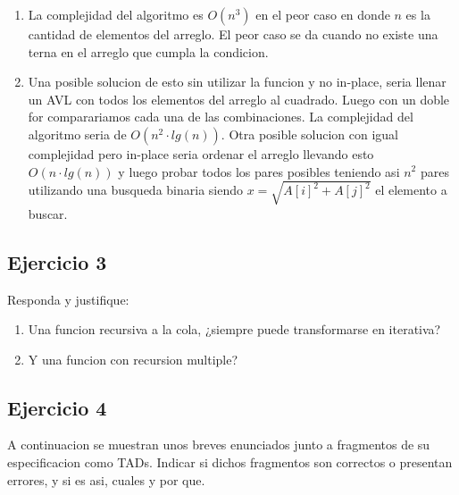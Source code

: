 \documentclass[10pt, a4paper]{article}
\begin{document}
\begin{enumerate}
 \item La complejidad del algoritmo es $O(n^3)$ en el peor caso en donde $n$ es la cantidad de elementos del arreglo. El peor caso se da cuando no existe una terna en el arreglo que cumpla la condicion.
 \item Una posible solucion de esto sin utilizar la funcion y no in-place, seria llenar un AVL con todos los elementos del arreglo al cuadrado. Luego con un doble for comparariamos cada una de las combinaciones. La complejidad del algoritmo seria de $O(n^2 \cdot lg(n))$. Otra posible solucion con igual complejidad pero in-place seria ordenar el arreglo llevando esto $O(n \cdot lg(n))$ y luego probar todos los pares posibles teniendo asi $n^2$ pares utilizando una busqueda binaria siendo $x = \sqrt{A[i]^2+A[j]^2}$ el elemento a buscar.
\end{enumerate}



\subsection*{Ejercicio 3}
Responda y justifique:
\begin{enumerate}
 \item Una funcion recursiva a la cola, ¿siempre puede transformarse en iterativa?
 \item Y una funcion con recursion multiple?
\end{enumerate}


\subsection*{Ejercicio 4} 
A continuacion se muestran unos breves enunciados junto a fragmentos de su especificacion como TADs. Indicar si dichos fragmentos son correctos o presentan errores, y si es asi, cuales y por que.
\end{document}
